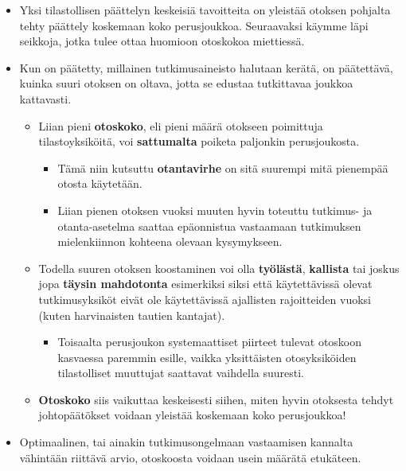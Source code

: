 \documentclass[
]{book}
\providecommand{\tightlist}{%
  \setlength{\itemsep}{0pt}\setlength{\parskip}{0pt}}
\begin{document}
\begin{itemize}
\tightlist
\item
  Yksi tilastollisen päättelyn keskeisiä tavoitteita on yleistää otoksen pohjalta tehty päättely koskemaan koko perusjoukkoa. Seuraavaksi käymme läpi seikkoja, jotka tulee ottaa huomioon otoskokoa miettiessä.
\item
  Kun on päätetty, millainen tutkimusaineisto halutaan kerätä, on päätettävä, kuinka suuri otoksen on oltava, jotta se edustaa tutkittavaa joukkoa kattavasti.

  \begin{itemize}
  \tightlist
  \item
    Liian pieni \textbf{otoskoko}, eli pieni määrä otokseen poimittuja tilastoyksiköitä, voi \textbf{sattumalta} poiketa paljonkin perusjoukosta.

    \begin{itemize}
    \tightlist
    \item
      Tämä niin kutsuttu \textbf{otantavirhe} on sitä suurempi mitä pienempää otosta käytetään.
    \item
      Liian pienen otoksen vuoksi muuten hyvin toteuttu tutkimus- ja otanta-asetelma saattaa epäonnistua vastaamaan tutkimuksen mielenkiinnon kohteena olevaan kysymykseen.
    \end{itemize}
  \item
    Todella suuren otoksen koostaminen voi olla \textbf{työlästä}, \textbf{kallista} tai joskus jopa \textbf{täysin mahdotonta} esimerkiksi siksi että käytettävissä olevat tutkimusyksiköt eivät ole käytettävissä ajallisten rajoitteiden vuoksi (kuten harvinaisten tautien kantajat).

    \begin{itemize}
    \tightlist
    \item
      Toisaalta perusjoukon systemaattiset piirteet tulevat otoskoon kasvaessa paremmin esille, vaikka yksittäisten otosyksiköiden tilastolliset muuttujat saattavat vaihdella suuresti.
    \end{itemize}
  \item
    \textbf{Otoskoko} siis vaikuttaa keskeisesti siihen, miten hyvin otoksesta tehdyt johtopäätökset voidaan yleistää koskemaan koko perusjoukkoa!
  \end{itemize}
\item
  Optimaalinen, tai ainakin tutkimusongelmaan vastaamisen kannalta vähintään riittävä arvio, otoskoosta voidaan usein määrätä etukäteen.
\end{itemize}
\end{document}
